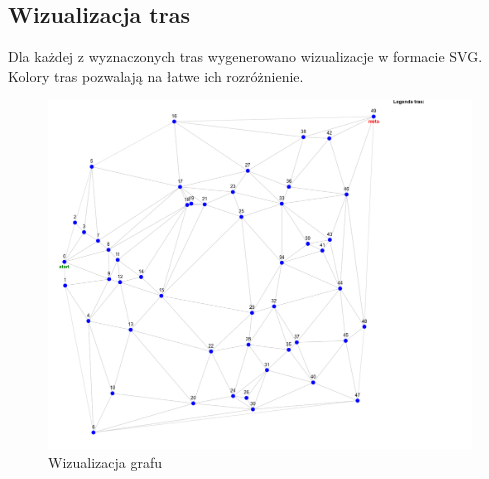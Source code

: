 \documentclass{article}
\begin{document}
\subsection*{Wizualizacja tras}

Dla każdej z wyznaczonych tras wygenerowano wizualizacje w formacie SVG. Kolory tras pozwalają na łatwe ich rozróżnienie.

\begin{figure}[H]
    \centering
    \includegraphics[width=1\linewidth]{model.png}
    \caption{Wizualizacja grafu}
    \label{fig:enter-label}
\end{figure}
\end{document}
